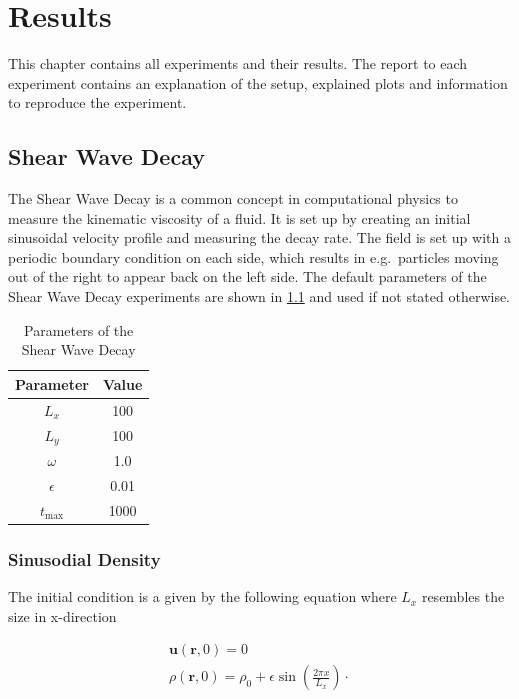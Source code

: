 \chapter{Results}\label{ch:results}
This chapter contains all experiments and their results.
The report to each experiment contains an explanation of the setup, explained plots and information to reproduce the experiment.


\section{Shear Wave Decay}\label{sec:shear-wave-decay}
The Shear Wave Decay is a common concept in computational physics to measure the kinematic viscosity of a fluid.
It is set up by creating an initial sinusoidal velocity profile and measuring the decay rate.
The field is set up with a periodic boundary condition on each side, which results in e.g.\ particles moving out of the right to appear back on the left side.
The default parameters of the Shear Wave Decay experiments are shown in \cref{tab:swd-parameters} and used if not stated otherwise.

\begin{table}[H]
    \centering %
    \begin{tabular}{c c}
        \hline\hline %
        Parameter  & Value \\ [0.5ex] %
        \hline %
        $L_x$      & 100   \\
        $L_y$      & 100   \\
        $\omega$   & 1.0   \\
        $\epsilon$ & 0.01  \\
        $t_{\max}$ & 1000  \\ [1ex] %
        \hline %
    \end{tabular}
    \caption{Parameters of the Shear Wave Decay} %
    \label{tab:swd-parameters}
\end{table}

\subsection{Sinusodial Density}
The initial condition is a given by the following equation where $L_x$ resembles the size in x-direction

\begin{equation*}
    \begin{gathered}
        \mathbf{u}(\mathbf{r},0) = 0 \\
        \rho(\mathbf{r},0) = \rho_0 + \epsilon \sin \left( \frac{2 \pi x}{L_x} \right) \cdot
    \end{gathered}
\end{equation*}

